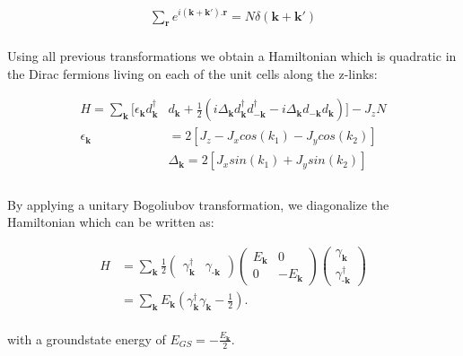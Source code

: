 \documentclass{article}
\begin{document}
\begin{equation}\label{eq:15}
	\begin{aligned}
		\sum_\textbf{r} e^{i(\textbf{k}+\textbf{k}').\textbf{r}} = N\delta(\textbf{k} + \textbf{k}')
	\end{aligned}
\end{equation}\\

Using all previous transformations we obtain a Hamiltonian which is quadratic in the Dirac fermions living on each of the unit cells along the z-links:

\begin{equation}\label{eq:16}
	\begin{aligned}
		H = \sum_\textbf{k}[\epsilon_\textbf{k}d^\dagger_{\textbf{k}}&d_{\textbf{k}} + \frac{1}{2}(i\Delta_\textbf{k}d^\dagger_{\textbf{k}}d^\dagger_{-\textbf{k}}-i\Delta_\textbf{k}d_{-\textbf{k}}d_{\textbf{k}})]-J_zN\\
		\epsilon_\textbf{k} &= 2[J_z-J_xcos(k_1)-J_ycos(k_2)]\\
		&\Delta_\textbf{k} = 2[J_xsin(k_1)+J_ysin(k_2)]\\
	\end{aligned}
\end{equation}\\

\noindent By applying a unitary Bogoliubov transformation, we diagonalize the Hamiltonian which can be written as:

\begin{equation}\label{eq:17}
	\begin{aligned}
		H &= \sum_\textbf{k} \frac{1}{2} 
		\begin{pmatrix}
			\gamma^\dagger_\textbf{k} & \gamma_{\textbf{-k}}
		\end{pmatrix}
		\begin{pmatrix}
			E_\textbf{k} & 0\\
			0 & -E_\textbf{k}
		\end{pmatrix}
		\begin{pmatrix} \gamma_\textbf{k} \\ \gamma^\dagger_{\textbf{-k}} \end{pmatrix}\\
		&= \sum_\textbf{k}E_\textbf{k}(\gamma^\dagger_\textbf{k}\gamma_{\textbf{k}}-\frac{1}{2}).
	\end{aligned}
\end{equation}\\

\noindent with a groundstate energy of $E_{GS} = -\frac{E_\textbf{k}}{2}$.
\end{document}
